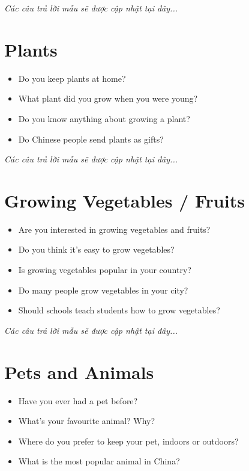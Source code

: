 \vspace{1em}
\textit{Các câu trả lời mẫu sẽ được cập nhật tại đây...}
\vspace{2em}

\section{Plants}
\begin{ieltsprompt}
\begin{itemize}[itemsep=4pt]
    \item Do you keep plants at home?
    \item What plant did you grow when you were young?
    \item Do you know anything about growing a plant?
    \item Do Chinese people send plants as gifts?
\end{itemize}
\end{ieltsprompt}

\vspace{1em}
\textit{Các câu trả lời mẫu sẽ được cập nhật tại đây...}
\vspace{2em}

\section{Growing Vegetables / Fruits}
\begin{ieltsprompt}
\begin{itemize}[itemsep=4pt]
    \item Are you interested in growing vegetables and fruits?
    \item Do you think it's easy to grow vegetables?
    \item Is growing vegetables popular in your country?
    \item Do many people grow vegetables in your city?
    \item Should schools teach students how to grow vegetables?
\end{itemize}
\end{ieltsprompt}

\vspace{1em}
\textit{Các câu trả lời mẫu sẽ được cập nhật tại đây...}
\vspace{2em}

\section{Pets and Animals}
\begin{ieltsprompt}
\begin{itemize}[itemsep=4pt]
    \item Have you ever had a pet before?
    \item What's your favourite animal? Why?
    \item Where do you prefer to keep your pet, indoors or outdoors?
    \item What is the most popular animal in China?
\end{itemize}
\end{ieltsprompt}

